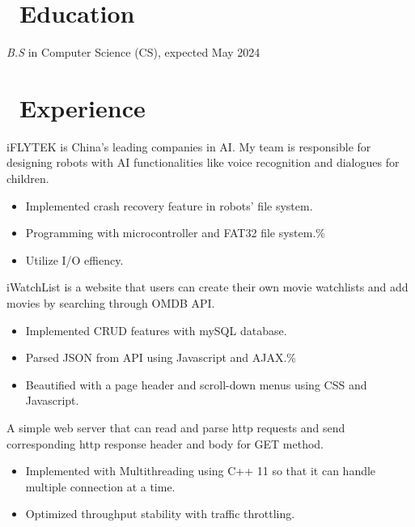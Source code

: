 \documentclass{resume}
\begin{document}



\section{\faGraduationCap\ Education}
\textit{B.S} in Computer Science (CS), expected May 2024

\section{\faUsers\ Experience}
  iFLYTEK is China's leading companies in AI. My team is responsible for designing robots with AI functionalities like voice recognition and dialogues for children.
\begin{itemize}
  \item Implemented crash recovery feature in robots' file system.
  \item Programming with microcontroller and FAT32 file system.\%
  \item Utilize I/O effiency.
\end{itemize}

  iWatchList is a website that users can create their own movie watchlists and add movies by searching through OMDB API.
\begin{itemize}
  \item Implemented CRUD features with mySQL database.
  \item Parsed JSON from API using Javascript and AJAX.\%
  \item Beautified with a page header and scroll-down menus using CSS and Javascript.
\end{itemize}

  A simple web server that can read and parse http requests and send corresponding http response header and body for GET method.
\begin{itemize}
  \item Implemented with Multithreading using C++ 11 so that it can handle multiple connection at a time.
  \item Optimized throughput stability with traffic throttling.
\end{itemize}
\end{document}
